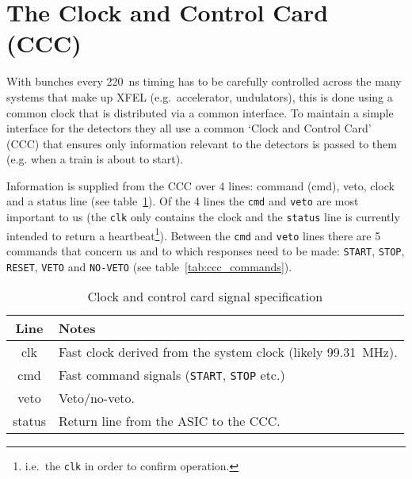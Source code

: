 \section{The Clock and Control Card (CCC)} %
\label{sec:the_clock_and_control_card_ccc}
With bunches every 220~ns timing has to be carefully controlled across the many systems  that make up XFEL (e.g.\ accelerator, undulators), this is done using a common clock that is distributed via a common interface. To maintain a simple interface for the detectors they all use a common `Clock and Control Card' (CCC) that ensures only information relevant to the detectors is passed to them (e.g. when a train is about to start). 
    
Information is supplied from the CCC over 4 lines: command (cmd), veto, clock and a status line (see table~\ref{tab:ccc_spec}). Of the 4 lines the \texttt{cmd} and \texttt{veto} are most important to us (the \texttt{clk} only contains the clock and the \texttt{status} line is currently intended to return a heartbeat\footnote{i.e.\ the \texttt{clk} in order to confirm operation.}). Between the \texttt{cmd} and \texttt{veto} lines there are 5 commands that concern us and to which responses need to be made: \texttt{START}, \texttt{STOP}, \texttt{RESET}, \texttt{VETO} and \texttt{NO-VETO} (see table~\ref{tab:ccc_commands}).
\begin{table}
    \begin{center}
        \begin{tabular}{c|l}
            Line & Notes \\
            \hline
            clk    & Fast clock derived from the system clock (likely 99.31~MHz).\\
            cmd    & Fast command signals (\texttt{START}, \texttt{STOP} etc.)   \\
            veto   & Veto/no-veto.                                               \\
            status & Return line from the ASIC to the CCC.                       \\
        \end{tabular}
    \end{center}
    \caption{Clock and control card signal specification}
    \label{tab:ccc_spec}
\end{table}
    
